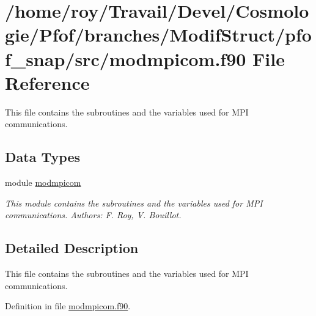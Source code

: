 \hypertarget{pfof__snap_2src_2modmpicom_8f90}{\section{/home/roy/\-Travail/\-Devel/\-Cosmologie/\-Pfof/branches/\-Modif\-Struct/pfof\-\_\-snap/src/modmpicom.f90 File Reference}
\label{pfof__snap_2src_2modmpicom_8f90}
}


This file contains the subroutines and the variables used for M\-P\-I communications.  


\subsection*{Data Types}
\begin{DoxyCompactItemize}
\item 
module \hyperlink{classmodmpicom}{modmpicom}
\begin{DoxyCompactList}\small\item\em This module contains the subroutines and the variables used for M\-P\-I communications. Authors\-: F. Roy, V. Bouillot. \end{DoxyCompactList}\end{DoxyCompactItemize}


\subsection{Detailed Description}
This file contains the subroutines and the variables used for M\-P\-I communications. 

Definition in file \hyperlink{pfof__snap_2src_2modmpicom_8f90_source}{modmpicom.\-f90}.

